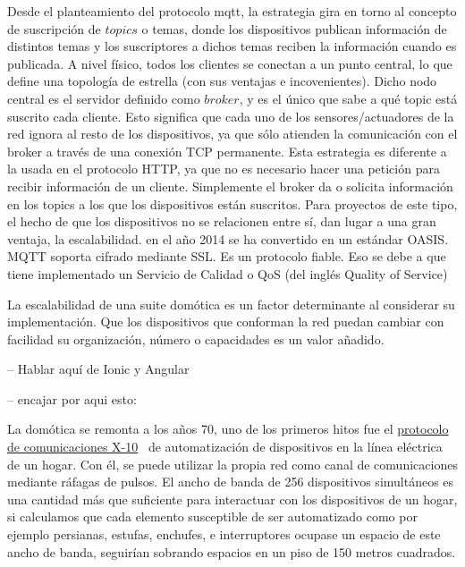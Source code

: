 Desde el planteamiento del protocolo \gls{mqtt}, la estrategia gira en torno al concepto de suscripción de $topics$ o temas, donde los dispositivos publican información de distintos temas y los suscriptores a dichos temas reciben la información cuando es publicada. A nivel físico, todos los clientes se conectan a un punto central, lo que define una topología de estrella (con sus ventajas e incovenientes). Dicho nodo central es el servidor definido como $broker$, y es el único que sabe a qué topic está suscrito cada cliente. Esto significa que cada uno de los sensores/actuadores de la red ignora al resto de los dispositivos, ya que sólo atienden la comunicación con el broker a través de una conexión TCP permanente. Esta estrategia es diferente a la usada en el protocolo HTTP, ya que no es necesario hacer una petición para recibir información de un cliente. Simplemente el broker da o solicita información en los topics a los que los dispositivos están suscritos. Para proyectos de este tipo, el hecho de que los dispositivos no se relacionen entre sí, dan lugar a una gran ventaja, la escalabilidad. en el año 2014 se ha convertido en un estándar OASIS. MQTT soporta cifrado mediante SSL. Es un protocolo fiable. Eso se debe a que tiene implementado un Servicio de Calidad o QoS (del inglés Quality of Service)

\vspace{1.5cm}

La escalabilidad de una suite domótica es un factor determinante al considerar su implementación. Que los dispositivos que conforman la red puedan cambiar con facilidad su organización, número o capacidades es un valor añadido.

\vspace{1.5cm}

-- Hablar aquí de Ionic y Angular

-- encajar por aqui esto:

La domótica se remonta a los años 70, uno de los primeros hitos fue el \href{https://es.wikipedia.org/wiki/X10}{protocolo de comunicaciones X-10}~\cite{x10protocolwikipedia} de automatización de dispositivos en la línea eléctrica de un hogar. Con él, se puede utilizar la propia red como canal de comunicaciones mediante ráfagas de pulsos. El ancho de banda de 256 dispositivos simultáneos es una cantidad más que suficiente para interactuar con los dispositivos de un hogar, si calculamos que cada elemento susceptible de ser automatizado como por ejemplo persianas, estufas, enchufes, e interruptores ocupase un espacio de este ancho de banda, seguirían sobrando espacios en un piso de 150 metros cuadrados.

